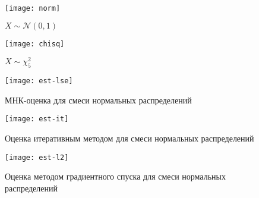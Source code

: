 \documentclass[../paper.tex]{subfiles}
\begin{document}
\begin{figure}[h]
	\begin{minipage}{0.48\textwidth}
		\centering
		\texttt{[image: norm]}
		\caption{$X \sim \mathcal{N}(0, 1)$}
		\label{norm}
	\end{minipage}\hfill
	\begin{minipage}{0.48\textwidth}
		\centering
		\texttt{[image: chisq]}
		\caption{$X \sim \chi^2_5$}
		\label{chisq}
	\end{minipage}\hfill
\end{figure}

\begin{figure}[h]
	\begin{minipage}{0.48\textwidth}
		\centering
		\texttt{[image: est-lse]}
		\caption{МНК-оценка для смеси нормальных распределений}
		\label{est-lse}
	\end{minipage}\hfill
	\begin{minipage}{0.48\textwidth}
		\centering
		\texttt{[image: est-it]}
		\caption{Оценка итеративным методом для смеси нормальных распределений}
		\label{est-it}
	\end{minipage}\hfill
\end{figure}

\begin{figure}[h]
	\begin{minipage}{0.48\textwidth}
		\centering
		\texttt{[image: est-l2]}
		\caption{Оценка методом градиентного спуска для смеси нормальных распределений}
		\label{est-l2}
	\end{minipage}\hfill
\end{figure}
\end{document}
